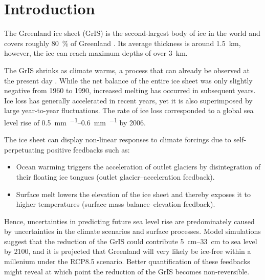 \section{Introduction}\label{sec:intro}



The Greenland ice sheet (GrIS) is the second-largest body of ice in the world and covers roughly \SI{80}{\percent} of Greenland \parencite{raikar2024}. Its average thickness is around \SI{1.5}{\km}, however, the ice can reach maximum depths of over \SI{3}{\km}. 

The GrIS shrinks as climate warms, a process that can already be observed at the present day \parencite[Ch.\ 14]{cuffey2010}. While the net balance of the entire ice sheet was only slightly negative from 1960 to 1990, increased melting has occurred in subsequent years. Ice loss has generally accelerated in recent years, yet it is also superimposed by large year-to-year fluctuations. The rate of ice loss corresponded to a global sea level rise of \SIrange{0.5}{0.6}{\mm\per\year} by 2006.

The ice sheet can display non-linear responses to climate forcings due to self-perpetuating positive feedbacks \parencite{aschwanden2019} such as:
\begin{itemize}
	\item Ocean warming triggers the acceleration of outlet glaciers by disintegration of their floating ice tongues (outlet glacier–acceleration feedback).
	\item Surface melt lowers the elevation of the ice sheet and thereby exposes it to higher temperatures (surface mass balance–elevation feedback).
\end{itemize}   

Hence, uncertainties in predicting future sea level rise are predominately caused by uncertainties in the climate scenarios and surface processes. Model simulations suggest that the reduction of the GrIS could contribute \SIrange{5}{33}{\cm} to sea level by 2100, and it is projected that Greenland will very likely be ice-free within a millenium under the RCP8.5 scenario. Better quantification of these feedbacks might reveal at which point the reduction of the GrIS becomes non-reversible.